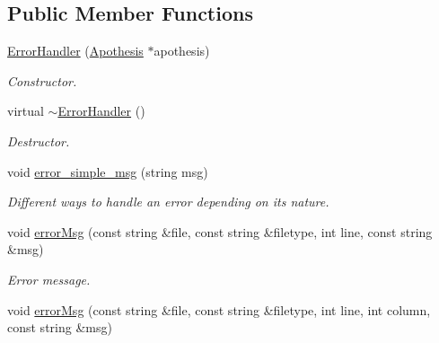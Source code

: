 \subsection*{Public Member Functions}
\begin{DoxyCompactItemize}
\item 
\mbox{\label{classUtils_1_1ErrorHandler_af9d42cd68ec6959575b23f5e0acd1674}} 
\mbox{\hyperlink{classUtils_1_1ErrorHandler_af9d42cd68ec6959575b23f5e0acd1674}{Error\+Handler}} (\mbox{\hyperlink{classApothesis}{Apothesis}} $\ast$apothesis)
\begin{DoxyCompactList}\small\item\em Constructor. \end{DoxyCompactList}\item 
\mbox{\label{classUtils_1_1ErrorHandler_ae9077e0d6ebdc00de2431b1fb83ee86f}} 
virtual \mbox{\hyperlink{classUtils_1_1ErrorHandler_ae9077e0d6ebdc00de2431b1fb83ee86f}{$\sim$\+Error\+Handler}} ()
\begin{DoxyCompactList}\small\item\em Destructor. \end{DoxyCompactList}\item 
void \mbox{\hyperlink{classUtils_1_1ErrorHandler_a8b2b06323fcdb8e996104ff33cfc6840}{error\+\_\+simple\+\_\+msg}} (string msg)
\begin{DoxyCompactList}\small\item\em Different ways to handle an error depending on its nature. \end{DoxyCompactList}\item 
\mbox{\label{classUtils_1_1ErrorHandler_a47765c6b3ec00dc1b17aeaa6c4e9a803}} 
void \mbox{\hyperlink{classUtils_1_1ErrorHandler_a47765c6b3ec00dc1b17aeaa6c4e9a803}{error\+Msg}} (const string \&file, const string \&filetype, int line, const string \&msg)
\begin{DoxyCompactList}\small\item\em Error message. \end{DoxyCompactList}\item 
\mbox{\label{classUtils_1_1ErrorHandler_a05f868786277d5bbdc4707c36f122ba6}} 
void \mbox{\hyperlink{classUtils_1_1ErrorHandler_a05f868786277d5bbdc4707c36f122ba6}{error\+Msg}} (const string \&file, const string \&filetype, int line, int column, const string \&msg)

\end{DoxyCompactItemize}
